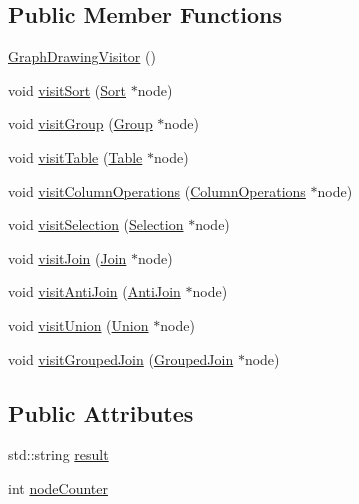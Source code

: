 \subsection*{Public Member Functions}
\begin{DoxyCompactItemize}
\item 
\hyperlink{classrafe_1_1_graph_drawing_visitor_a98fc0486336c9673c7c5eac940724ae5}{Graph\+Drawing\+Visitor} ()
\item 
void \hyperlink{classrafe_1_1_graph_drawing_visitor_a5ba892e7e9400af6d1d2f89a896babd8}{visit\+Sort} (\hyperlink{classrafe_1_1_sort}{Sort} $\ast$node)
\item 
void \hyperlink{classrafe_1_1_graph_drawing_visitor_aad5e1614a18f3d7aed5933775f614abf}{visit\+Group} (\hyperlink{classrafe_1_1_group}{Group} $\ast$node)
\item 
void \hyperlink{classrafe_1_1_graph_drawing_visitor_af5badeaa3070842bac2bad0e5bc38092}{visit\+Table} (\hyperlink{classrafe_1_1_table}{Table} $\ast$node)
\item 
void \hyperlink{classrafe_1_1_graph_drawing_visitor_a9933ed338ece545335fbad4052bf0c13}{visit\+Column\+Operations} (\hyperlink{classrafe_1_1_column_operations}{Column\+Operations} $\ast$node)
\item 
void \hyperlink{classrafe_1_1_graph_drawing_visitor_a01be2fcea00f7b0d7d70fa3dd168156c}{visit\+Selection} (\hyperlink{classrafe_1_1_selection}{Selection} $\ast$node)
\item 
void \hyperlink{classrafe_1_1_graph_drawing_visitor_abcf9e0f8c7a305923282701a17f56a8e}{visit\+Join} (\hyperlink{classrafe_1_1_join}{Join} $\ast$node)
\item 
void \hyperlink{classrafe_1_1_graph_drawing_visitor_ad21a6c42f42490a47ebb0b858a34f527}{visit\+Anti\+Join} (\hyperlink{classrafe_1_1_anti_join}{Anti\+Join} $\ast$node)
\item 
void \hyperlink{classrafe_1_1_graph_drawing_visitor_a093a7d242525ae764e2790ea06c74a9e}{visit\+Union} (\hyperlink{classrafe_1_1_union}{Union} $\ast$node)
\item 
void \hyperlink{classrafe_1_1_graph_drawing_visitor_a71b14af8909a3fe79c117ee8c8580352}{visit\+Grouped\+Join} (\hyperlink{classrafe_1_1_grouped_join}{Grouped\+Join} $\ast$node)
\end{DoxyCompactItemize}
\subsection*{Public Attributes}
\begin{DoxyCompactItemize}
\item 
std\+::string \hyperlink{classrafe_1_1_graph_drawing_visitor_a943dc1e93020b9adaa1ca6eff5c73bdd}{result}
\item 
int \hyperlink{classrafe_1_1_graph_drawing_visitor_a826fb63b5690180f6cf3c1f7fd0300b4}{node\+Counter}
\end{DoxyCompactItemize}
